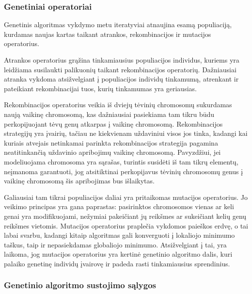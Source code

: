 \documentclass{VUMIFInfKursinis}
\begin{document}
\subsubsection{Genetiniai operatoriai}

Genetinis algoritmas vykdymo metu iteratyviai atnaujina esamą populiaciją, kurdamas naujas kartas taikant atrankos, rekombinacijos ir mutacijos operatorius.


Atrankos operatorius grąžina tinkamiausius populiacijos individus, kuriems yra leidžiama susilaukti palikuonių taikant rekombinacijos operatorių.
Dažniausiai atranka vykdoma atsižvelgiant į populiacijos individų tinkamumą, atrenkant ir pateikiant rekombinacijai tuos, kurių tinkamumas yra geriausias.


Rekombinacijos operatorius veikia iš dviejų tėvinių chromosomų sukurdamas naują vaikinę chromosomą, kas dažniausiai pasiekiama
tam tikru būdu perkopijuojant tėvų genų atkarpas į vaikinę chromosomą.
Rekombinacijos strategijų yra įvairių, tačiau ne kiekvienam uždaviniui visos jos tinka, kadangi
kai kuriais atvejais netinkamai parinkta rekombinacijos strategija pagamina neatitinkančią uždavinio apribojimų vaikinę chromosomą.
Pavyzdžiui, jei modeliuojama chromosoma yra sąrašas, turintis susidėti iš tam tikrų elementų, neįmanoma garantuoti, jog atsitiktinai
perkopijavus tėvinių chromosomų genus į vaikinę chromosomą šis apribojimas bus išlaikytas.


Galiausiai tam tikrai populiacijos daliai yra pritaikomas mutacijos operatorius.
Jo veikimo principas yra gana paprastas: pasirinktos chromosomos vienas ar keli genai yra modifikuojami,
nežymiai pakeičiant jų reikšmes ar sukeičiant kelių genų reikšmes vietomis.
Mutacijos operatorius praplečia vykdomos paieškos erdvę, o tai labai svarbu, kadangi kitaip algoritmas gali konverguoti
į lokaliojo minimumo taškus, taip ir nepasiekdamas globaliojo minimumo.
Atsižvelgiant į tai, yra laikoma, jog mutacijos operatorius yra kertinė genetinio algoritmo dalis,
kuri palaiko genetinę individų įvairovę ir padeda rasti tinkamiausius sprendinius.

\subsubsection{Genetinio algoritmo sustojimo sąlygos}
\end{document}
